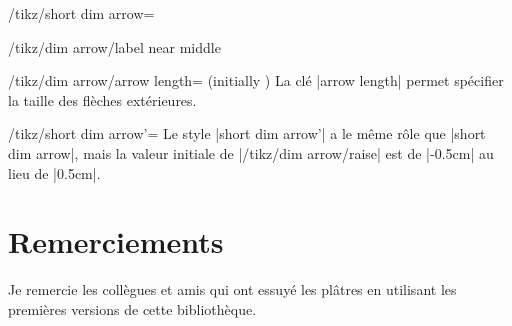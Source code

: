 \documentclass[a4paper]{ltxdoc}
\begin{document}
\begin{stylekey}{/tikz/short dim arrow=}
\begin{key}{/tikz/dim arrow/label near middle}
\begin{codeexample}[]
\end{codeexample}
  \end{key}



  \begin{key}{/tikz/dim arrow/arrow length= (initially )}
  La clé |arrow length| permet spécifier la taille  des flèches extérieures.
  \end{key}
\end{stylekey}

\begin{stylekey}{/tikz/short dim arrow'=}
  Le style |short dim arrow'| a le même rôle que |short dim arrow|, mais la valeur initiale de |/tikz/dim arrow/raise| est de |-0.5cm| au lieu de |0.5cm|.

  \begin{codeexample}[width=4cm]
  \end{codeexample}
\end{stylekey}

\section{Remerciements}

Je remercie les collègues et amis qui ont essuyé les plâtres en utilisant les premières versions de cette bibliothèque.
\end{document}
